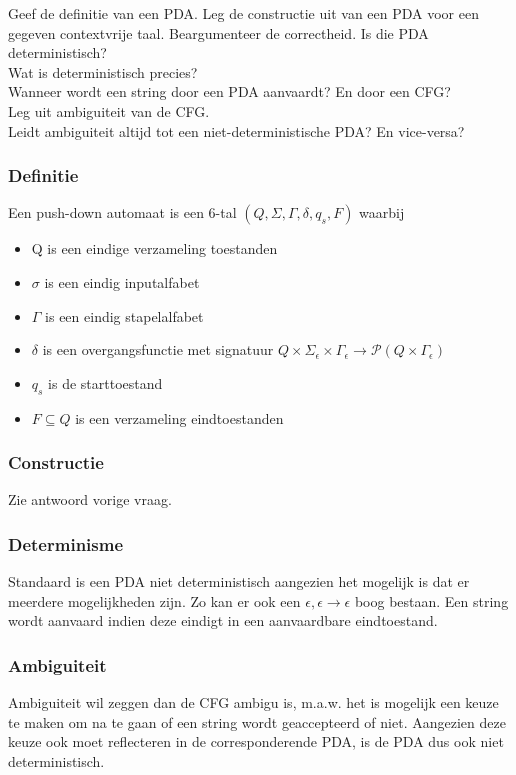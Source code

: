 \begin{quest}[Vraag 10]
  Geef de definitie van een PDA. Leg de constructie uit van een PDA voor een gegeven contextvrije taal. Beargumenteer de correctheid.
  Is die PDA deterministisch?\\
  Wat is deterministisch precies?\\
  Wanneer wordt een string door een PDA aanvaardt? En door een CFG?\\
  Leg uit ambiguiteit van de CFG.\\
  Leidt ambiguiteit altijd tot een niet-deterministische PDA? En vice-versa?
\end{quest}

\subsubsection*{Definitie}

\begin{theorem}
  Een push-down automaat is een 6-tal $(Q,\Sigma, \Gamma, \delta, q_s, F)$ waarbij
  \begin{itemize}
    \item Q is een eindige verzameling toestanden
    \item $\sigma$ is een eindig inputalfabet
    \item $\Gamma$ is een eindig stapelalfabet
    \item $\delta$ is een overgangsfunctie met signatuur $Q \times \Sigma_\epsilon \times \Gamma_\epsilon \rightarrow \mathcal{P}(Q \times \Gamma_\epsilon)$
    \item $q_s$ is de starttoestand
    \item $F \subseteq Q$ is een verzameling eindtoestanden
  \end{itemize}
\end{theorem}

\subsubsection*{Constructie}

Zie antwoord vorige vraag.

\subsubsection*{Determinisme}

Standaard is een PDA niet deterministisch aangezien het mogelijk is dat er meerdere mogelijkheden zijn. Zo kan er ook een $\epsilon, \epsilon \rightarrow \epsilon$ boog bestaan. Een string wordt aanvaard indien deze eindigt in een aanvaardbare eindtoestand.

\subsubsection*{Ambiguiteit}

Ambiguiteit wil zeggen dan de CFG ambigu is, m.a.w. het is mogelijk een keuze te maken om na te gaan of een string wordt geaccepteerd of niet. Aangezien deze keuze ook moet reflecteren in de corresponderende PDA, is de PDA dus ook niet deterministisch.
